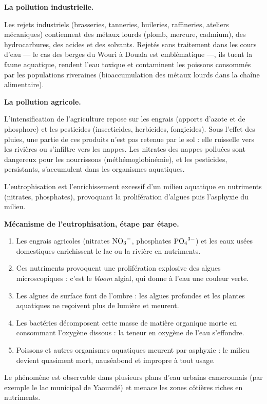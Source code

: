 \documentclass[11pt]{article}
\newcommand{\cle}[1]{{\popxbold\color{popdark}#1}}
\begin{document}
\textbf{La pollution industrielle.}\par
Les rejets industriels (brasseries, tanneries, huileries, raffineries, ateliers mécaniques) contiennent des métaux lourds (plomb, mercure, cadmium), des hydrocarbures, des acides et des solvants. Rejetés sans traitement dans les cours d'eau — le cas des berges du Wouri à Douala est emblématique —, ils tuent la faune aquatique, rendent l'eau toxique et contaminent les poissons consommés par les populations riveraines (bioaccumulation des métaux lourds dans la chaîne alimentaire).

\textbf{La pollution agricole.}\par
L'intensification de l'agriculture repose sur les \cle{engrais} (apports d'azote et de phosphore) et les \cle{pesticides} (insecticides, herbicides, fongicides). Sous l'effet des pluies, une partie de ces produits n'est pas retenue par le sol : elle ruisselle vers les rivières ou s'infiltre vers les nappes. Les nitrates des nappes polluées sont dangereux pour les nourrissons (méthémoglobinémie), et les pesticides, persistants, s'accumulent dans les organismes aquatiques.

\begin{definition}[L'eutrophisation]
L'\cle{eutrophisation} est l'enrichissement excessif d'un milieu aquatique en nutriments (nitrates, phosphates), provoquant la prolifération d'algues puis l'asphyxie du milieu.
\end{definition}

\textbf{Mécanisme de l'eutrophisation, étape par étape.}\par
\begin{enumerate}
\item Les engrais agricoles (nitrates $\ce{NO3-}$, phosphates $\ce{PO4^{3-}}$) et les eaux usées domestiques enrichissent le lac ou la rivière en nutriments.
\item Ces nutriments provoquent une prolifération explosive des algues microscopiques : c'est le \emph{bloom} algial, qui donne à l'eau une couleur verte.
\item Les algues de surface font de l'ombre : les algues profondes et les plantes aquatiques ne reçoivent plus de lumière et meurent.
\item Les bactéries décomposent cette masse de matière organique morte en consommant l'oxygène dissous : la teneur en oxygène de l'eau s'effondre.
\item Poissons et autres organismes aquatiques meurent par asphyxie : le milieu devient quasiment mort, nauséabond et impropre à tout usage.
\end{enumerate}
Le phénomène est observable dans plusieurs plans d'eau urbains camerounais (par exemple le lac municipal de Yaoundé) et menace les zones côtières riches en nutriments.
\end{document}
